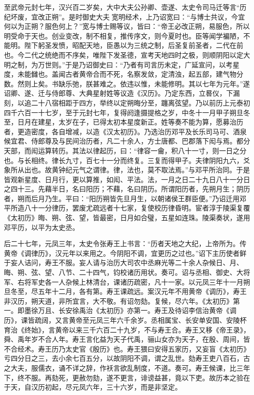 \documentclass[]{article}
\begin{document}
至武帝元封七年，汉兴百二岁矣，大中大夫公孙卿、壶遂、太史令司马迁等言``历纪坏废，宜改正朔''。是时御史大夫宽明经术，上乃诏宽曰：``与博士共议，今宜何以为正朔？服色何上？''宽与博士赐等议，皆曰：``帝王必改正朔，易服色，所以明受命于天也。创业变改，制不相复，推传序文，则今夏时也。臣等闻学褊陋，不能明。陛下躬圣发愤，昭配天地，臣愚以为三统之制，后圣复前圣者，二代在前也。今二代之统绝而不序矣，唯陛下发圣德，宣考天地四时之极，则顺阴阳以定大明之制，为万世则。''于是乃诏御史曰：``乃者有司言历未定，广延宣问，以考星度，未能雠也。盖闻古者黄帝合而不死，名察发敛，定清浊，起五部，建气物分数。然则上矣。书缺乐弛，朕甚难之。依违以惟，未能修明。其以七年为元年。''遂诏卿、遂、迁与侍郎尊、大典星射姓等议造《汉历》。乃定东西，立晷仪，下漏刻，以追二十八宿相距于四方，举终以定朔晦分至，躔离弦望。乃以前历上元泰初四千六百一十七岁，至于元封七年，复得阏逢摄提格之岁，中冬十一月甲子朔旦冬至，日月在建星，太岁在子，已得太初本星度新正。姓等奏不能为算，愿募治历者，更造密度，各自增减，以造《汉太初历》。乃选治历邓平及长乐司马可、酒泉候宜君、侍郎尊及与民间治历者，凡二十余人，方士唐都、巴郡落下闳与焉。都分天部，而闳运算转历。其法以律起历，曰：``律容一龠，积八十一寸，则一日之分也。与长相终。律长九寸，百七十一分而终复。三复而得甲子。夫律阴阳九六，爻象所从出也。故黄钟纪元气之谓律。律，法也，莫不取法焉。''与邓平所治同。于是皆观新星度、日月行，更以算推，如闳、平法。法，一月之日二十九日八十一分日之四十三。先藉半日，名曰阳历；不藉，名曰阴历。所谓阳历者，先朔月生；阴历者，朔而后月乃生。平曰：``阳历朔皆先旦月生，以朝诸侯王群臣便。''乃诏迁用邓平所造八十一分律历，罢废尤疏远者十七家，复使校历律昏明。宦者淳于陵渠复覆《太初历》晦、朔、弦、望，皆最密，日月如合璧，五星如连珠。陵渠奏状，遂用邓平历，以平为太史丞。

后二十七年，元凤三年，太史令张寿王上书言：``历者天地之大纪，上帝所为。传黄帝《调律历》，汉元年以来用之。今阴阳不调，宜更历之过也。''诏下主历使者鲜于妄人诘问，寿王不服。妄人请与治历大司农中丞麻光等二十余人杂候日、月、晦、朔、弦、望、八节、二十四气，钧校诸历用状。奏可。诏与丞相、御史、大将军、右将军史各一人杂候上林清台，课诸历疏密，凡十一家。以元凤三年十一月朔旦冬至，尽五年十二月，各有第。寿王课疏远。案汉元年不用黄帝《调历》，寿王非汉历，朔天道，非所宜言，大不敬。有诏勿劾。复候，尽六年。《太初历》第一。即墨徐万且、长安徐禹治《太初历》亦第一。寿王及待诏李信治黄帝《调历》，课皆疏阔，又言黄帝至元凤三年六千余岁。丞相属宝、长安单安国、安陵杯育治《终始》，言黄帝以来三千六百二十九岁，不与寿王合。寿王又移《帝王录》，舜、禹年岁不合人年。寿王言化益为天子代禹，骊山女亦为天子，在殷、周间，皆不合经术。寿王历乃太史官《殷历》也。寿王猥曰安得五家历，又妄盲《太初历》亏四分日之三，去小余七百五分，以故阴阳不调，谓之乱世。劾寿王吏八百石，古之大夫，服儒衣，诵不详之辞，作袄言欲乱制度，不道。奏可。寿王候课，比三年下，终不服。再劾死，更赦勿劾，遂不更言，诽谤益甚，竟以下吏。故历本之验在于天，自汉历初起，尽元凤六年，三十六岁，而是非坚定。
\end{document}
